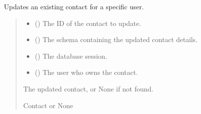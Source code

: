 \documentclass[letterpaper,10pt,english]{sphinxmanual}
\begin{document}
\begin{fulllineitems}
\label{\detokenize{index:src.repository.contacts.update_contact}}
\pysigstartsignatures
{}
\pysigstopsignatures
\sphinxAtStartPar
Updates an existing contact for a specific user.
\begin{quote}\begin{description}
\begin{itemize}
\item {} 
\sphinxAtStartPar
{} () \textendash{} The ID of the contact to update.

\item {} 
\sphinxAtStartPar
{} () \textendash{} The schema containing the updated contact details.

\item {} 
\sphinxAtStartPar
{} () \textendash{} The database session.

\item {} 
\sphinxAtStartPar
{} () \textendash{} The user who owns the contact.

\end{itemize}

\sphinxAtStartPar
The updated contact, or None if not found.

\sphinxAtStartPar
Contact or None

\end{description}\end{quote}

\end{fulllineitems}
\end{document}
